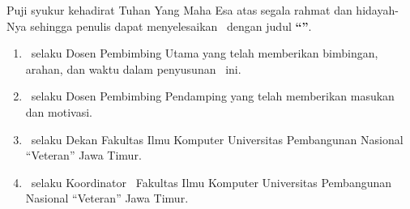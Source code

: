 Puji syukur kehadirat Tuhan Yang Maha Esa atas segala rahmat dan hidayah-Nya sehingga penulis dapat menyelesaikan \DocTypeLabel\ dengan judul \textbf{``\ThesisTitle''}. \DegreeRequirement


\begin{enumerate}
  \item \AdvisorOne\ selaku Dosen Pembimbing Utama yang telah memberikan bimbingan, arahan, dan waktu dalam penyusunan \DocTypeNameLower\ ini.
  \item \AdvisorTwo\ selaku Dosen Pembimbing Pendamping yang telah memberikan masukan dan motivasi.
  \item \DeanName\ selaku Dekan Fakultas Ilmu Komputer Universitas Pembangunan Nasional ``Veteran'' Jawa Timur.
  \item \HeadOfProgramName\ selaku Koordinator \StudyProgramPhrase\ Fakultas Ilmu Komputer Universitas Pembangunan Nasional ``Veteran'' Jawa Timur.
\end{enumerate}
